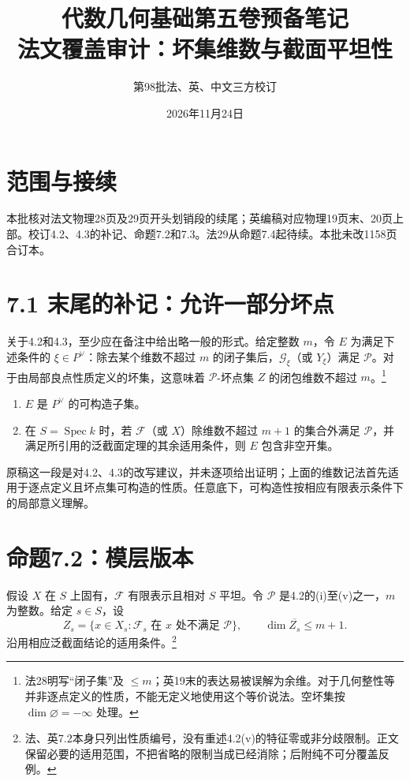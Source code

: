 \documentclass[openany,fontset=fandol]{ctexbook}
\DeclareMathOperator{\Spec}{Spec}
\newcommand{\FF}{\mathcal F}
\newcommand{\GG}{\mathcal G}
\newcommand{\calP}{\mathcal P}
\begin{document}
\title{代数几何基础第五卷预备笔记\\法文覆盖审计：坏集维数与截面平坦性}
\author{第98批\quad 法、英、中文三方校订}
\date{2026年11月24日}
\maketitle

\section*{范围与接续}
本批核对法文物理28页及29页开头划销段的续尾；英编稿对应物理19页末、20页上部。校订4.2、4.3的补记、命题7.2和7.3。法29从命题7.4起待续。本批未改1158页合订本。

\section*{7.1 末尾的补记：允许一部分坏点}
关于4.2和4.3，至少应在备注中给出略一般的形式。给定整数 $m$，令 $E$ 为满足下述条件的 $\xi\in P^\vee$：除去某个维数不超过 $m$ 的闭子集后，$\GG_\xi$（或 $Y_\xi$）满足 $\calP$。对于由局部良点性质定义的坏集，这意味着 $\calP$-坏点集 $Z$ 的闭包维数不超过 $m$。\footnote{法28明写“闭子集”及 $\le m$；英19末的表达易被误解为余维。对于几何整性等并非逐点定义的性质，不能无定义地使用这个等价说法。空坏集按 $\dim\varnothing=-\infty$ 处理。}

\begin{enumerate}[label=\alph*)]
\item $E$ 是 $P^\vee$ 的可构造子集。
\item 在 $S=\Spec k$ 时，若 $\FF$（或 $X$）除维数不超过 $m+1$ 的集合外满足 $\calP$，并满足所引用的泛截面定理的其余适用条件，则 $E$ 包含非空开集。
\end{enumerate}
\noindent 原稿这一段是对4.2、4.3的改写建议，并未逐项给出证明；上面的维数记法首先适用于逐点定义且坏点集可构造的性质。任意底下，可构造性按相应有限表示条件下的局部意义理解。

\section*{命题7.2：模层版本}
假设 $X$ 在 $S$ 上固有，$\FF$ 有限表示且相对 $S$ 平坦。令 $\calP$ 是4.2的(i)至(v)之一，$m$ 为整数。给定 $s\in S$，设
\[
 Z_s=\{x\in X_s:\FF_s\text{ 在 }x\text{ 处不满足 }\calP\},
 \qquad \dim\overline{Z_s}\le m+1.
\]
沿用相应泛截面结论的适用条件。\footnote{法、英7.2本身只列出性质编号，没有重述4.2(v)的特征零或非分歧限制。正文保留必要的适用范围，不把省略的限制当成已经消除；后附纯不可分覆盖反例。}
\end{document}
